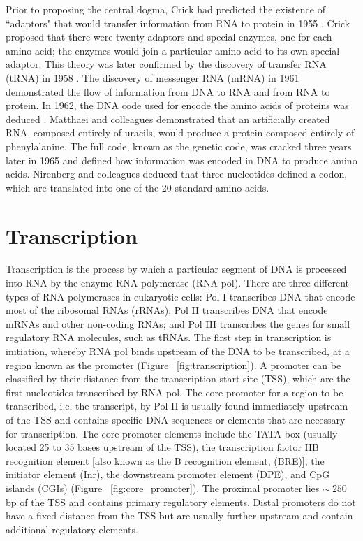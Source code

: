 Prior to proposing the central dogma, Crick had predicted the existence of ``adaptors" that would transfer information from RNA to protein in 1955 \citep{cricktrna1955}. Crick proposed that there were twenty adaptors and special enzymes, one for each amino acid; the enzymes would join a particular amino acid to its own special adaptor. This theory was later confirmed by the discovery of transfer RNA (tRNA) in 1958 \citep{pmid13538965}. The discovery of messenger RNA (mRNA) in 1961  \citep{BRENNER1961} demonstrated the flow of information from DNA to RNA and from RNA to protein. In 1962, the DNA code used for encode the amino acids of proteins was deduced \citep{pmid14471390}. Matthaei and colleagues demonstrated that an artificially created RNA, composed entirely of uracils, would produce a protein composed entirely of phenylalanine. The full code, known as the genetic code, was cracked three years later in 1965 \citep{pmid5330357} and defined how information was encoded in DNA to produce amino acids. Nirenberg and colleagues deduced that three nucleotides defined a codon, which are translated into one of the 20 standard amino acids.

\section{Transcription}

Transcription is the process by which a particular segment of DNA is processed into RNA by the enzyme RNA polymerase (RNA pol). There are three different types of RNA polymerases in eukaryotic cells: Pol I transcribes DNA that encode most of the ribosomal RNAs (rRNAs); Pol II transcribes DNA that encode mRNAs and other non-coding RNAs; and Pol III transcribes the genes for small regulatory RNA molecules, such as tRNAs. The first step in transcription is initiation, whereby RNA pol binds upstream of the DNA to be transcribed, at a region known as the promoter (Figure ~\ref{fig:transcription}). A promoter can be classified by their distance from the transcription start site (TSS), which are the first nucleotides transcribed by RNA pol. The core promoter for a region to be transcribed, i.e. the transcript, by Pol II is usually found immediately upstream of the TSS and contains specific DNA sequences or elements that are necessary for transcription. The core promoter elements include the TATA box (usually located 25 to 35 bases upstream of the TSS), the transcription factor IIB recognition element [also known as the B recognition element, (BRE)], the initiator element (Inr), the downstream promoter element (DPE), and CpG islands (CGIs) (Figure ~\ref{fig:core_promoter}). The proximal promoter lies $\sim~250$ bp of the TSS and contains primary regulatory elements. Distal promoters do not have a fixed distance from the TSS but are usually further upstream and contain additional regulatory elements.

